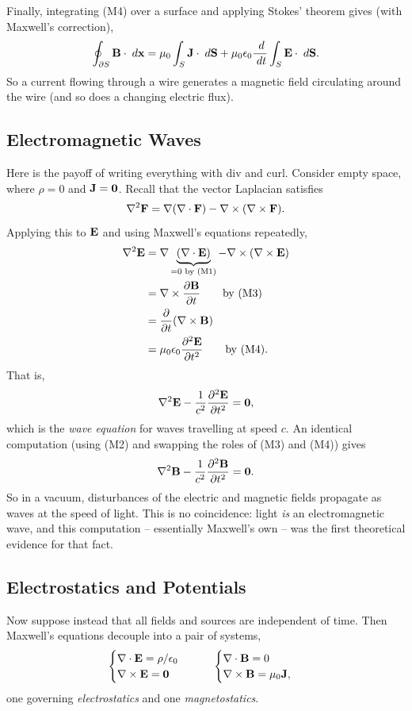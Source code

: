 \documentclass[a4paper]{scrartcl}
\begin{document}
Finally, integrating (M4) over a surface and applying Stokes' theorem gives  (with Maxwell's correction),
$$
\oint_{\partial S} \mathbf{B} \cdot \; d \mathbf{x} = \mu_0 \int_S \mathbf{J} \cdot \; d \mathbf{S} + \mu_0 \epsilon_0 \frac{\; d}{\; d t}\int_S \mathbf{E} \cdot \; d \mathbf{S}.
$$
So a current flowing through a wire generates a magnetic field circulating around the wire (and so does a changing electric flux).

\subsection{Electromagnetic Waves}

Here is the payoff of writing everything with div and curl. Consider empty space, where $\rho = 0$ and $\mathbf{J} = \mathbf{0}$. Recall that the vector Laplacian satisfies
$$
\nabla^2 \mathbf{F} = \nabla (\nabla \cdot \mathbf{F}) - \nabla \times (\nabla \times \mathbf{F}).
$$
Applying this to $\mathbf{E}$ and using Maxwell's equations repeatedly,
\begin{align*}
	\nabla^2 \mathbf{E} &= \nabla \underbrace{(\nabla \cdot \mathbf{E})}_{= 0 \text{ by (M1)}} - \nabla \times (\nabla \times \mathbf{E}) \\
	&= \nabla \times \frac{\partial \mathbf{B}}{\partial t} \quad \quad \text{by (M3)}\\
	&= \frac{\partial}{\partial t} (\nabla \times \mathbf{B}) \\
	&= \mu_0 \epsilon_0 \frac{\partial^2 \mathbf{E}}{\partial t^2} \quad \quad \text{by (M4)}.
\end{align*}
That is,
$$
\nabla^2 \mathbf{E} - \frac{1}{c^2} \frac{\partial^2 \mathbf{E}}{\partial t^2} = \mathbf{0},
$$
which is the \emph{wave equation} for waves travelling at speed $c$. An identical computation (using (M2) and swapping the roles of (M3) and (M4)) gives
$$
\nabla^2 \mathbf{B} - \frac{1}{c^2}\frac{\partial^2 \mathbf{B}}{\partial t^2} = \mathbf{0}.
$$
So in a vacuum, disturbances of the electric and magnetic fields propagate as waves at the speed of light. This is no coincidence: light \emph{is} an electromagnetic wave, and this computation -- essentially Maxwell's own -- was the first theoretical evidence for that fact.

\subsection{Electrostatics and Potentials}

Now suppose instead that all fields and sources are independent of time. Then Maxwell's equations decouple into a pair of systems,
$$
\begin{cases}
	\nabla \cdot \mathbf{E} = \rho/\epsilon_0 \\
	\nabla \times \mathbf{E} = \mathbf{0}
\end{cases}
\quad \quad
\begin{cases}
	\nabla \cdot \mathbf{B} = 0\\
	\nabla \times \mathbf{B} = \mu_0 \mathbf{J},
\end{cases}
$$
one governing \emph{electrostatics} and one \emph{magnetostatics}.
\end{document}
